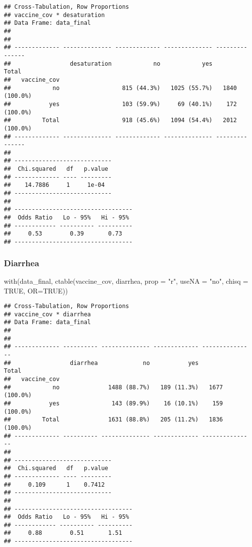 \documentclass[
]{article}
\newenvironment{Shaded}{\begin{snugshade}}{\end{snugshade}}
\newcommand{\AttributeTok}[1]{\textcolor[rgb]{0.77,0.63,0.00}{#1}}
\newcommand{\ConstantTok}[1]{\textcolor[rgb]{0.00,0.00,0.00}{#1}}
\newcommand{\FunctionTok}[1]{\textcolor[rgb]{0.00,0.00,0.00}{#1}}
\newcommand{\NormalTok}[1]{#1}
\newcommand{\StringTok}[1]{\textcolor[rgb]{0.31,0.60,0.02}{#1}}
\begin{document}
\begin{verbatim}
## Cross-Tabulation, Row Proportions  
## vaccine_cov * desaturation  
## Data Frame: data_final  
## 
## 
## ------------- -------------- ------------- -------------- ---------------
##                 desaturation            no            yes           Total
##   vaccine_cov                                                            
##            no                  815 (44.3%)   1025 (55.7%)   1840 (100.0%)
##           yes                  103 (59.9%)     69 (40.1%)    172 (100.0%)
##         Total                  918 (45.6%)   1094 (54.4%)   2012 (100.0%)
## ------------- -------------- ------------- -------------- ---------------
## 
## ----------------------------
##  Chi.squared   df   p.value 
## ------------- ---- ---------
##    14.7886     1     1e-04  
## ----------------------------
## 
## ----------------------------------
##  Odds Ratio   Lo - 95%   Hi - 95% 
## ------------ ---------- ----------
##     0.53        0.39       0.73   
## ----------------------------------
\end{verbatim}

\hypertarget{diarrhea}{%
\subsubsection{Diarrhea}\label{diarrhea}}

\begin{Shaded}
\begin{Highlighting}[]
\FunctionTok{with}\NormalTok{(data\_final, }\FunctionTok{ctable}\NormalTok{(vaccine\_cov, diarrhea, }\AttributeTok{prop =} \StringTok{"r"}\NormalTok{, }\AttributeTok{useNA =} \StringTok{"no"}\NormalTok{, }\AttributeTok{chisq =} \ConstantTok{TRUE}\NormalTok{, }\AttributeTok{OR=}\ConstantTok{TRUE}\NormalTok{))}
\end{Highlighting}
\end{Shaded}

\begin{verbatim}
## Cross-Tabulation, Row Proportions  
## vaccine_cov * diarrhea  
## Data Frame: data_final  
## 
## 
## ------------- ---------- -------------- ------------- ---------------
##                 diarrhea             no           yes           Total
##   vaccine_cov                                                        
##            no              1488 (88.7%)   189 (11.3%)   1677 (100.0%)
##           yes               143 (89.9%)    16 (10.1%)    159 (100.0%)
##         Total              1631 (88.8%)   205 (11.2%)   1836 (100.0%)
## ------------- ---------- -------------- ------------- ---------------
## 
## ----------------------------
##  Chi.squared   df   p.value 
## ------------- ---- ---------
##     0.109      1    0.7412  
## ----------------------------
## 
## ----------------------------------
##  Odds Ratio   Lo - 95%   Hi - 95% 
## ------------ ---------- ----------
##     0.88        0.51       1.51   
## ----------------------------------
\end{verbatim}
\end{document}
